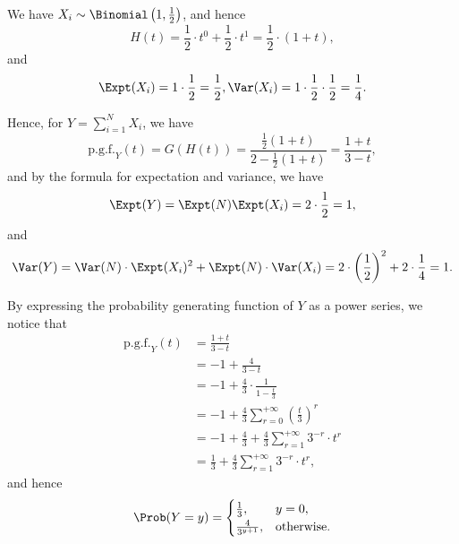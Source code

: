 We have \(X_i \sim \Binomial\left(1, \frac{1}{2}\right)\), and hence
\[
    H(t) = \frac{1}{2} \cdot t^0 + \frac{1}{2} \cdot t^1 = \frac{1}{2} \cdot (1 + t),
\]
and
\[
    \Expt(X_i) = 1 \cdot \frac{1}{2} = \frac{1}{2}, \Var(X_i) = 1 \cdot \frac{1}{2} \cdot \frac{1}{2} = \frac{1}{4}.
\]

Hence, for \(Y = \sum_{i = 1}^{N} X_i\), we have
\[
    \text{p.g.f.}_{Y}(t) = G(H(t)) = \frac{\frac{1}{2} (1 + t)}{2 - \frac{1}{2} (1 + t)} = \frac{1 + t}{3 - t},
\]
and by the formula for expectation and variance, we have
\[
    \Expt(Y) = \Expt(N) \Expt(X_i) = 2 \cdot \frac{1}{2} = 1,
\]
and
\[
    \Var(Y) = \Var(N) \cdot \Expt(X_i)^2 + \Expt(N) \cdot \Var(X_i) = 2 \cdot \left(\frac{1}{2}\right)^2 + 2 \cdot \frac{1}{4} = 1.
\]

By expressing the probability generating function of \(Y\) as a power series, we notice that
\begin{align*}
    \text{p.g.f.}_{Y}(t) & = \frac{1 + t}{3 - t}                                                    \\
                         & = -1 + \frac{4}{3 - t}                                                   \\
                         & = -1 + \frac{4}{3} \cdot \frac{1}{1 - \frac{t}{3}}                       \\
                         & = -1 + \frac{4}{3} \sum_{r = 0}^{+\infty} \left(\frac{t}{3}\right)^r     \\
                         & = -1 + \frac{4}{3} + \frac{4}{3} \sum_{r = 1}^{+\infty} 3^{-r} \cdot t^r \\
                         & = \frac{1}{3} + \frac{4}{3} \sum_{r = 1}^{+\infty} 3^{-r} \cdot t^r,
\end{align*}
and hence
\begin{align*}
    \Prob(Y = y) = \begin{cases}
                       \frac{1}{3},         & y = 0,            \\
                       \frac{4}{3^{y + 1}}, & \text{otherwise}.
                   \end{cases}
\end{align*}